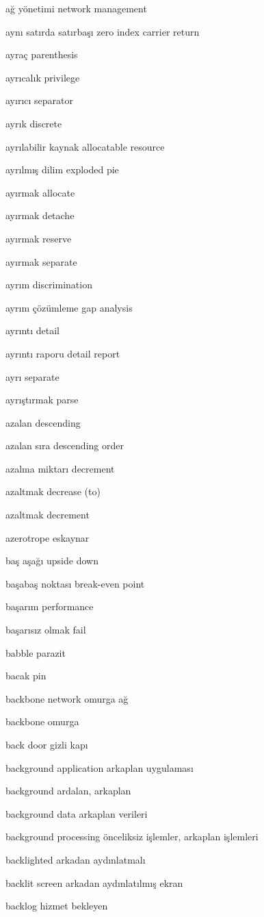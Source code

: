 \documentclass[12pt,fleqn]{article}\usepackage{../../common}
\begin{document}
ağ yönetimi network management

aynı satırda satırbaşı zero index carrier return

ayraç parenthesis

ayrıcalık privilege

ayırıcı separator

ayrık discrete

ayrılabilir kaynak allocatable resource

ayrılmış dilim exploded pie

ayırmak allocate

ayırmak detache

ayırmak reserve

ayırmak separate

ayrım discrimination

ayrım çözümleme gap analysis

ayrıntı detail

ayrıntı raporu detail report

ayrı separate

ayrıştırmak parse

azalan descending

azalan sıra descending order

azalma miktarı decrement

azaltmak decrease (to)

azaltmak decrement

azerotrope eskaynar

baş aşağı upside down

başabaş noktası break-even point

başarım performance

başarısız olmak fail

babble parazit

bacak pin

backbone network omurga ağ

backbone omurga

back door gizli kapı

background application arkaplan uygulaması

background ardalan, arkaplan

background data arkaplan verileri

background processing önceliksiz işlemler, arkaplan işlemleri

backlighted arkadan aydınlatmalı

backlit screen arkadan aydınlatılmış ekran

backlog hizmet bekleyen
\end{document}
